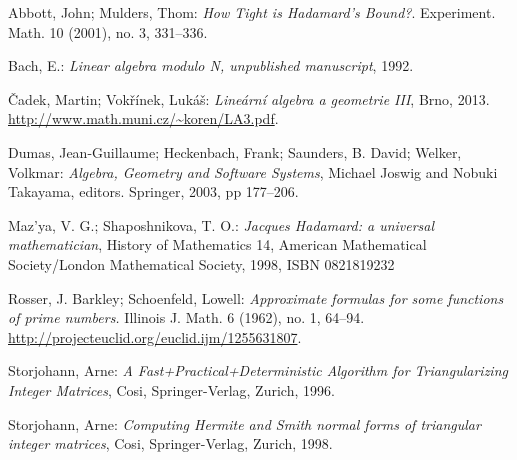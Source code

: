 \begin{thebibliography}{10}

Abbott, John; Mulders, Thom: \textit{How Tight is Hadamard's Bound?}.
Experiment. Math. 10 (2001), no. 3, 331--336.

Bach, E.: \textit{Linear algebra modulo N, unpublished manuscript}, 1992.

Čadek, Martin; Vokřínek, Lukáš: \textit{Lineární algebra a geometrie III},
Brno, 2013. \url{http://www.math.muni.cz/~koren/LA3.pdf}.

Dumas, Jean-Guillaume; Heckenbach, Frank; Saunders, B. David; Welker, Volkmar:
\textit{Algebra, Geometry and Software Systems}, Michael Joswig and Nobuki Takayama, editors. Springer, 2003, pp 177--206.

Maz'ya, V. G.; Shaposhnikova, T. O.: \textit{Jacques Hadamard: a universal mathematician},
History of Mathematics 14, American Mathematical Society/London Mathematical Society, 1998, ISBN 0821819232

Rosser, J. Barkley; Schoenfeld, Lowell: \textit{Approximate formulas for some functions of prime numbers.}
Illinois J. Math. 6 (1962), no. 1, 64--94. 
\url{http://projecteuclid.org/euclid.ijm/1255631807}.

Storjohann, Arne: \textit{A Fast+Practical+Deterministic Algorithm for Triangularizing Integer Matrices},
Cosi, Springer-Verlag, Zurich, 1996.

Storjohann, Arne: \textit{Computing Hermite and Smith normal forms
of triangular integer matrices},
Cosi, Springer-Verlag, Zurich, 1998.


\end{thebibliography}

\cleardoublepage
